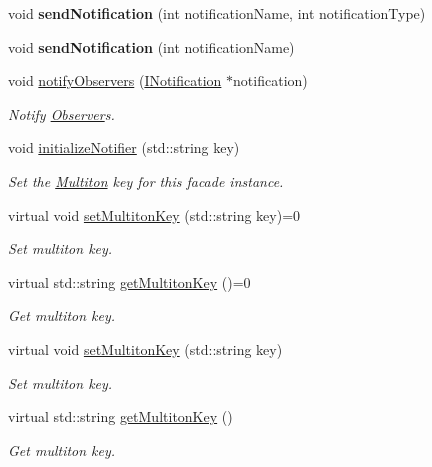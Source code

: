 \begin{DoxyCompactItemize}
\item 
\hypertarget{class_pure_m_v_c_1_1_facade_a210da4543349399b59c3325028bb3c38}{
void {\bfseries sendNotification} (int notificationName, int notificationType)}
\label{class_pure_m_v_c_1_1_facade_a210da4543349399b59c3325028bb3c38}

\item 
\hypertarget{class_pure_m_v_c_1_1_facade_a105e18768a2d8aee32221d5c08eee9df}{
void {\bfseries sendNotification} (int notificationName)}
\label{class_pure_m_v_c_1_1_facade_a105e18768a2d8aee32221d5c08eee9df}

\item 
void \hyperlink{class_pure_m_v_c_1_1_facade_a605e0e774d8d4d9b31fcb040a14fec77}{notifyObservers} (\hyperlink{class_pure_m_v_c_1_1_i_notification}{INotification} $\ast$notification)
\begin{DoxyCompactList}\small\item\em Notify {\ttfamily \hyperlink{class_pure_m_v_c_1_1_observer}{Observer}}s. \item\end{DoxyCompactList}\item 
void \hyperlink{class_pure_m_v_c_1_1_facade_a94c72ff29f9f42ff084f247b180fb4ad}{initializeNotifier} (std::string key)
\begin{DoxyCompactList}\small\item\em Set the \hyperlink{class_pure_m_v_c_1_1_multiton}{Multiton} key for this facade instance. \item\end{DoxyCompactList}\item 
virtual void \hyperlink{class_pure_m_v_c_1_1_i_multiton_key_heir_a03acb75ab79defba2c28b8de1bbe1ca6}{setMultitonKey} (std::string key)=0
\begin{DoxyCompactList}\small\item\em Set multiton key. \item\end{DoxyCompactList}\item 
virtual std::string \hyperlink{class_pure_m_v_c_1_1_i_multiton_key_heir_aecccfb9898368c6377550ceae5730934}{getMultitonKey} ()=0
\begin{DoxyCompactList}\small\item\em Get multiton key. \item\end{DoxyCompactList}\item 
virtual void \hyperlink{class_pure_m_v_c_1_1_multiton_key_heir_abc70ef7c066bc8d7bf0196ec727599bb}{setMultitonKey} (std::string key)
\begin{DoxyCompactList}\small\item\em Set multiton key. \item\end{DoxyCompactList}\item 
virtual std::string \hyperlink{class_pure_m_v_c_1_1_multiton_key_heir_aa5622459d33380deb08dc3cab8b991c7}{getMultitonKey} ()
\begin{DoxyCompactList}\small\item\em Get multiton key. \item\end{DoxyCompactList}\end{DoxyCompactItemize}
